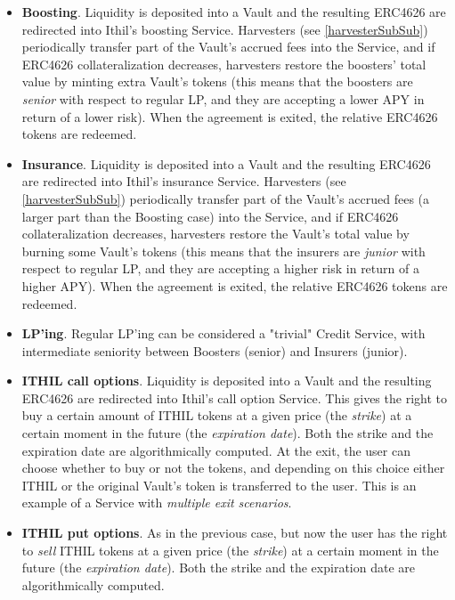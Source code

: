 \documentclass[a4paper,10 pt]{article}
\theoremstyle{definition}
\begin{document}
\begin{itemize}
\item {\bf Boosting}. Liquidity is deposited into a Vault and the resulting ERC4626 are redirected into Ithil's boosting Service. Harvesters (see \ref{harvesterSubSub}) periodically transfer part of the Vault's accrued fees into the Service, and if ERC4626 collateralization decreases, harvesters restore the boosters' total value by minting extra Vault's tokens (this means that the boosters are {\it senior} with respect to regular LP, and they are accepting a lower APY in return of a lower risk). When the agreement is exited, the relative ERC4626 tokens are redeemed.

\item {\bf Insurance}. Liquidity is deposited  into a Vault and the resulting ERC4626 are redirected into Ithil's insurance Service.  Harvesters (see \ref{harvesterSubSub}) periodically transfer part of the Vault's accrued fees (a larger part than the Boosting case) into the Service,  and if ERC4626 collateralization decreases, harvesters restore the Vault's total value by burning some Vault's tokens  (this means that the insurers are {\it junior} with respect to regular LP, and they are accepting a higher risk in return of a higher APY). When the agreement is exited, the relative ERC4626 tokens are redeemed.

\item {\bf LP'ing}. Regular LP'ing can be considered a "trivial" Credit Service, with intermediate seniority between Boosters (senior) and Insurers (junior).

\item {\bf ITHIL call options}. Liquidity is deposited  into a Vault and the resulting ERC4626 are redirected into Ithil's call option Service. This gives the right to buy a certain amount of ITHIL tokens at a given price (the {\it strike}) at a certain moment in the future (the {\it expiration date}). Both the strike and the expiration date are algorithmically computed. At the exit, the user can choose whether to buy or not the tokens, and depending on this choice either ITHIL or the original Vault's token is transferred to the user. This is an example of a Service with {\it multiple exit scenarios}.

\item {\bf ITHIL put options}. As in the previous case, but now the user has the right to {\it sell} ITHIL tokens at a given price (the {\it strike}) at a certain moment in the future (the {\it expiration date}). Both the strike and the expiration date are algorithmically computed.
\end{itemize}
\end{document}
